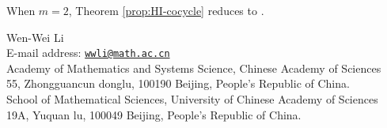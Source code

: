 \documentclass[a4paper,10pt]{article}
\begin{document}
When $m=2$, Theorem \ref{prop:HI-cocycle} reduces to \cite[Proposition 5.13]{Li11}.


\printindex

\printbibliography[heading=bibintoc]	%

\vspace{1em}
\begin{flushleft}
	Wen-Wei Li \\
	E-mail address: \href{mailto:wwli@math.ac.cn}{\texttt{wwli@math.ac.cn}} \\
	Academy of Mathematics and Systems Science, Chinese Academy of Sciences \\
	55, Zhongguancun donglu, 100190 Beijing, People's Republic of China. \\ \vspace{0.7em}
	School of Mathematical Sciences, University of Chinese Academy of Sciences \\
	19A, Yuquan lu, 100049 Beijing, People's Republic of China.
\end{flushleft}
\end{document}
